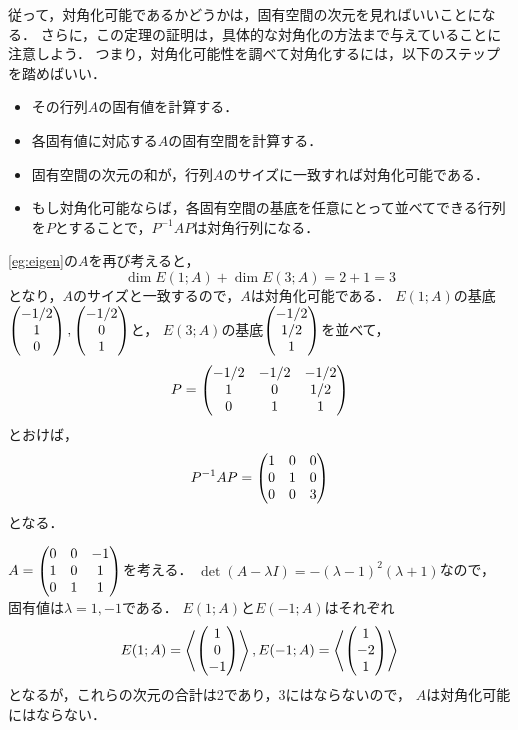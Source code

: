 従って，対角化可能であるかどうかは，固有空間の次元を見ればいいことになる．
さらに，この定理の証明は，具体的な対角化の方法まで与えていることに注意しよう．
つまり，対角化可能性を調べて対角化するには，以下のステップを踏めばいい．
\begin{itemize}
    \item その行列$A$の固有値を計算する．
    \item 各固有値に対応する$A$の固有空間を計算する．
    \item 固有空間の次元の和が，行列$A$のサイズに一致すれば対角化可能である．
    \item もし対角化可能ならば，各固有空間の基底を任意にとって並べてできる行列を$P$とすることで，$P^{-1}AP$は対角行列になる．
\end{itemize}
\begin{example}
    \cref{eg:eigen}の$A$を再び考えると，
    \[
        \dim E(1;A) + \dim E(3;A) = 2 + 1 = 3    
    \]
    となり，$A$のサイズと一致するので，$A$は対角化可能である．
    $E(1;A)$の基底$\begin{pmatrix} -1/2 \\ 1 \\ 0 \end{pmatrix},\begin{pmatrix} -1/2 \\ 0 \\ 1 \end{pmatrix}$と，
    $E(3;A)$の基底$\begin{pmatrix} -1/2 \\ 1/2 \\ 1 \end{pmatrix}$を並べて，
    \[
        P = \begin{pmatrix} -1/2 & -1/2 & -1/2 \\ 1 & 0 & 1/2 \\ 0 & 1 & 1 \end{pmatrix}    
    \]
    とおけば，
    \[
        P^{-1}AP = \begin{pmatrix} 1 & 0 & 0 \\ 0 & 1 & 0 \\ 0 & 0 & 3 \end{pmatrix}    
    \]
    となる．
\end{example}
\begin{example}
    $A=\begin{pmatrix} 0 & 0 & -1 \\ 1 & 0 & 1 \\ 0 & 1 & 1 \end{pmatrix}$を考える．
    $\det (A-\lambda I) = -(\lambda-1)^2(\lambda+1)$なので，
    固有値は$\lambda=1,-1$である．
    $E(1;A)$と$E(-1;A)$はそれぞれ
    \[
        E(1;A) = \left\langle \begin{pmatrix} 1 \\ 0 \\ -1 \end{pmatrix} \right\rangle,
        E(-1;A) = \left\langle \begin{pmatrix} 1 \\ -2 \\ 1 \end{pmatrix} \right\rangle    
    \]
    となるが，これらの次元の合計は2であり，3にはならないので，
    $A$は対角化可能にはならない．
\end{example}
